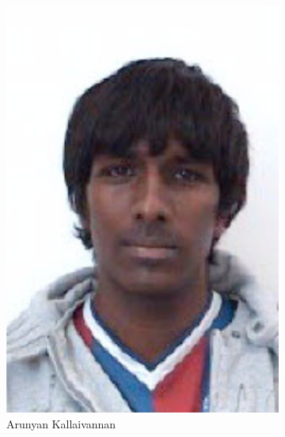 \begin{figure}
\begin{subfigure}[b]{0.45\textwidth}
        \includegraphics[height=0.3\textheight]{Files/AK}
        \caption{Arunyan Kallaivannan}
    \end{subfigure}\\
    \vspace{0.5cm}
    \begin{subfigure}[b]{0.45\textwidth}
        \centering

\end{subfigure}
\end{figure}
